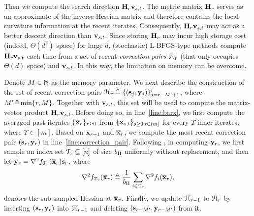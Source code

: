 \documentclass[10pt,twocolumn,journal]{IEEEtran}
\begin{document}
Then we compute the search direction $\mathbf{H}_r\mathbf{v}_{s,t}$. %
The metric matrix $\mathbf{H}_r$ serves as an approximate of the inverse Hessian matrix and therefore contains the local curvature information at the recent iterates. Consequently, $\mathbf{H}_r\mathbf{v}_{s,t}$ may act as a better descent direction than $\mathbf{v}_{s,t}$. Since storing $\mathbf{H}_r$ may incur high storage cost (indeed, $\Theta(d^2)$ space) for large $d$, (stochastic) L-BFGS-type methods compute $\mathbf{H}_r\mathbf{v}_{s,t}$ each time from a set of recent {\em correction pairs} $\mathcal{H}_r$ (that only occupies $\Theta(d)$ space) and $\mathbf{v}_{s,t}$. %
In this way, the limitation on memory can be overcome. 

 Denote $M\in\mathbb{N}$  as the {memory parameter}. We next describe the construction of the set of recent correction pairs $\mathcal{H}_r\triangleq \{(\mathbf{s}_j,\mathbf{y}_j)\}_{j=r-M'+1}^r$, where $M'\!\triangleq\!\min\{r,M\}$. Together with $\mathbf{v}_{s,t}$, this set %
  will be used to compute the matrix-vector product $\mathbf{H}_r\mathbf{v}_{s,t}$.  %
Before doing so, in line~\ref{line:barx}, we first compute the averaged past iterates $\{\overline{\bf x}_r\}_{r\ge 0}$ from $\{\mathbf{x}_{s,t}\}_{s\ge 0, t\in(m]}$ for every $\Upsilon$ inner iterates, where $\Upsilon\!\in\![m]$. %
Based on $\overline{\bf x}_{r-1}$ and $\overline{\bf x}_r$, we compute the most recent {correction pair}  $(\mathbf{s}_r,\mathbf{y}_r)$ in line~\ref{line:correction_pair}. Following \cite{Byrd_16a}, in computing $\mathbf{y}_r$,  we first sample an index set $\mathcal{T}_r\subseteq[n]$ of size $b_{\mathrm{H}}$ uniformly without replacement, and then let $\mathbf{y}_r = \nabla^2 f_{\mathcal{T}_r} (\overline{\bf x}_r)\mathbf{s}_r$, where %
\begin{equation}
\nabla^2 f_{\mathcal{T}_r} (\overline{\bf x}_r)\triangleq \frac{1}{b_{\mathrm{H}}}\sum_{i\in\mathcal{T}_r} \nabla^2 f_{i} (\overline{\bf x}_r),\label{eq:subsampHessian}
\end{equation}
denotes the sub-sampled Hessian at $\overline{\bf x}_r$. Finally, we update  $\mathcal{H}_{r-1}$ to $\mathcal{H}_r$ by inserting $(\mathbf{s}_r,\mathbf{y}_r)$ into $\mathcal{H}_{r-1}$ and deleting $(\mathbf{s}_{r-M'},\mathbf{y}_{r-M'})$ from it. 
\end{document}
